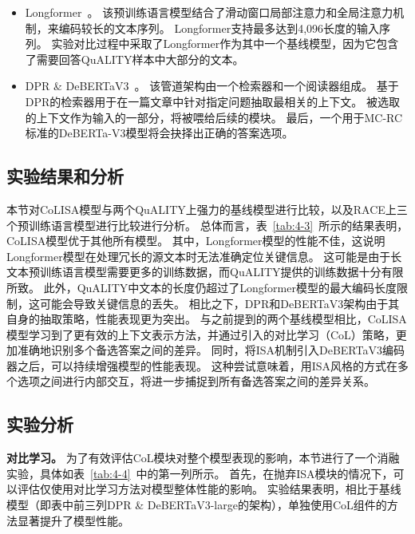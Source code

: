 \begin{itemize}
    \item Longformer~\cite{beltagy2020longformer}。
        该预训练语言模型结合了滑动窗口局部注意力和全局注意力机制，来编码较长的文本序列。
        Longformer支持最多达到4,096长度的输入序列。
        实验对比过程中采取了Longformer作为其中一个基线模型，因为它包含了需要回答QuALITY样本中大部分的文本。
    \item DPR \& DeBERTaV3~\cite{karpukhin2020dense,he2021debertav3}。
        该管道架构由一个检索器和一个阅读器组成。
        基于DPR的检索器用于在一篇文章中针对指定问题抽取最相关的上下文。
        被选取的上下文作为输入的一部分，将被喂给后续的模块。
        最后，一个用于MC-RC标准的DeBERTa-V3模型将会抉择出正确的答案选项。
\end{itemize}

\subsection{实验结果和分析}



本节对CoLISA模型与两个QuALITY上强力的基线模型进行比较，以及RACE上三个预训练语言模型进行比较进行分析。
总体而言，表~\ref{tab:4-3}~所示的结果表明，CoLISA模型优于其他所有模型。
其中，Longformer模型的性能不佳，这说明Longformer模型在处理冗长的源文本时无法准确定位关键信息。
这可能是由于长文本预训练语言模型需要更多的训练数据，而QuALITY提供的训练数据十分有限所致。
此外，QuALITY中文本的长度仍超过了Longformer模型的最大编码长度限制，这可能会导致关键信息的丢失。
相比之下，DPR和DeBERTaV3架构由于其自身的抽取策略，性能表现更为突出。
与之前提到的两个基线模型相比，CoLISA模型学习到了更有效的上下文表示方法，并通过引入的对比学习（CoL）策略，更加准确地识别多个备选答案之间的差异。
同时，将ISA机制引入DeBERTaV3编码器之后，可以持续增强模型的性能表现。
这种尝试意味着，用ISA风格的方式在多个选项之间进行内部交互，将进一步捕捉到所有备选答案之间的差异关系。

\subsection{实验分析}



\noindent \textbf{对比学习。}
为了有效评估CoL模块对整个模型表现的影响，本节进行了一个消融实验，具体如表~\ref{tab:4-4}~中的第一列所示。
首先，在抛弃ISA模块的情况下，可以评估仅使用对比学习方法对模型整体性能的影响。
实验结果表明，相比于基线模型（即表中前三列DPR \& DeBERTaV3-large的架构），单独使用CoL组件的方法显著提升了模型性能。

